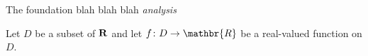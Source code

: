 

The foundation blah blah blah \emph{analysis}

Let $D$ be a subset of $\bf R$ and let $f \colon D \to \mathbr{R}$ be a real-valued function on $D$.



